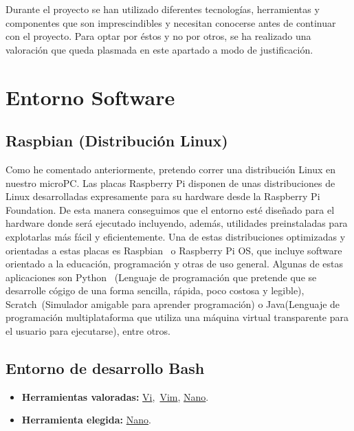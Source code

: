 
Durante el proyecto se han utilizado diferentes tecnologías, herramientas y componentes que son imprescindibles y necesitan conocerse antes de continuar con el proyecto. Para optar por éstos y no por otros, se ha realizado una valoración que queda plasmada en este apartado a modo de justificación.

\section{Entorno Software}
\subsection{Raspbian (Distribución Linux)}\label{4:RaspbianOS}
Como he comentado anteriormente, pretendo correr una distribución Linux en nuestro microPC. Las placas Raspberry Pi disponen de unas distribuciones de Linux desarrolladas expresamente para su hardware desde la Raspberry Pi Foundation. De esta manera conseguimos que el entorno esté diseñado para el hardware donde será ejecutado incluyendo, además, utilidades preinstaladas para explotarlas más fácil y eficientemente. Una de estas distribuciones optimizadas y orientadas a estas placas es Raspbian~\cite{misc:RbPWeb} o Raspberry Pi OS, que incluye software orientado a la educación, programación y otras de uso general. Algunas de estas aplicaciones son Python~\cite{misc:Python} (Lenguaje de programación que pretende que se desarrolle cógigo de una forma sencilla, rápida, poco costosa y legible), Scratch~\cite{misc:Scratch}(Simulador amigable para aprender programación) o Java\cite{misc:Java}(Lenguaje de programación multiplataforma que utiliza una máquina virtual transparente para el usuario para ejecutarse), entre otros.

\subsection{Entorno de desarrollo Bash}\label{4:BASH}
\begin{itemize}
    \item \textbf{Herramientas valoradas:} \href{https://www.freebsd.org/cgi/man.cgi?query=vi&sektion=1}{Vi},~\href{https://www.vim.org/}{Vim}, \href{https://www.nano-editor.org/}{Nano}.
    \item \textbf{Herramienta elegida:} \href{https://www.nano-editor.org/}{Nano}.
\end{itemize}

